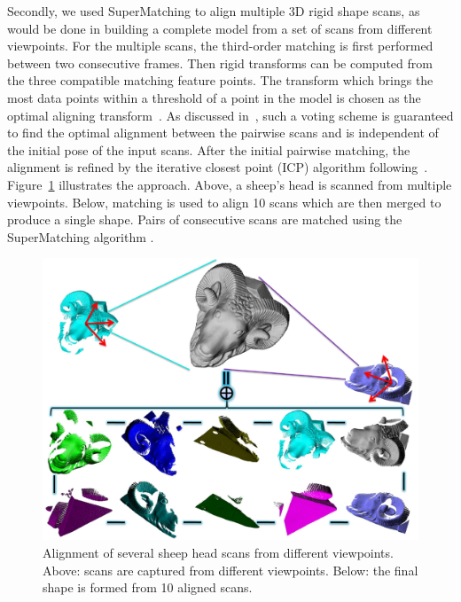 Secondly, we used  SuperMatching to align multiple 3D rigid shape scans, as would
be done in building a complete model from a set of scans from different viewpoints.
For the multiple scans, the
third-order matching is first performed between two consecutive frames.
Then rigid transforms can be computed from the three compatible matching feature points.
The transform which brings the most data points within a threshold of a point in the model is chosen as the optimal aligning transform~\cite{Huttenlocher90}.
As discussed in~\cite{Gelfand05}, such a voting scheme is guaranteed to find the optimal alignment  between the pairwise scans and is independent of the initial pose of the input scans.
After the initial pairwise matching, the alignment is refined by the iterative closest point (ICP) algorithm following~\cite{Gelfand05}.
Figure~\ref{fig:3DRigid} illustrates the approach.
Above, a sheep's head  is scanned from multiple viewpoints. Below, matching is used to align 10 scans which are then merged to produce a single  shape.
Pairs of consecutive scans are matched using the SuperMatching algorithm .

\begin{figure}
\centering
  \includegraphics[width=0.99\linewidth]{figures/3DRigid.pdf}
  \caption{Alignment of several sheep head scans from different viewpoints. Above: scans are captured from different viewpoints. Below: the final shape is formed from 10 aligned scans.}
\label{fig:3DRigid}
\end{figure}


